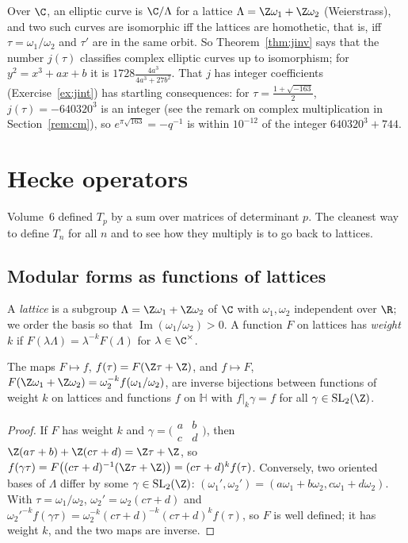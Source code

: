 Over $\C$, an elliptic curve is $\C/\Lambda$ for a lattice $\Lambda=\Z\omega_1+\Z\omega_2$ (Weierstrass), and two such curves are isomorphic iff the lattices are
homothetic, that is, iff $\tau=\omega_1/\omega_2$ and $\tau'$ are in the same orbit. So Theorem~\ref{thm:jinv} says that the number $j(\tau)$ classifies complex
elliptic curves up to isomorphism; for $y^2=x^3+ax+b$ it is $1728\frac{4a^3}{4a^3+27b^2}$. That $j$ has integer coefficients (Exercise~\ref{ex:jint}) has
startling consequences: for $\tau=\frac{1+\sqrt{-163}}2$, $j(\tau)=-640320^3$ is an integer (see the remark on complex multiplication in Section~\ref{rem:cm}), so $e^{\pi\sqrt{163}}=-q^{-1}$ is within $10^{-12}$ of the
integer $640320^3+744$.

\section{Hecke operators}

Volume~6 defined $T_p$ by a sum over matrices of determinant $p$. The cleanest way to define $T_n$ for all $n$ and to see how they multiply is to go back to lattices.

\subsection*{Modular forms as functions of lattices}

A \emph{lattice} is a subgroup $\Lambda=\Z\omega_1+\Z\omega_2$ of $\C$ with $\omega_1,\omega_2$ independent over $\R$; we order the basis so that
$\operatorname{Im}(\omega_1/\omega_2)>0$. A function $F$ on lattices has \emph{weight $k$} if $F(\lambda\Lambda)=\lambda^{-k}F(\Lambda)$ for $\lambda\in\C^\times$.

\begin{lemma}\label{lem:latticefn}
The maps $F\mapsto f$, $f(\tau)=F(\Z\tau+\Z)$, and $f\mapsto F$, $F(\Z\omega_1+\Z\omega_2)=\omega_2^{-k}f(\omega_1/\omega_2)$, are inverse bijections between
functions of weight $k$ on lattices and functions $f$ on $\mathbb H$ with $f|_k\gamma=f$ for all $\gamma\in\mathrm{SL}_2(\Z)$.
\end{lemma}
\begin{proof}
If $F$ has weight $k$ and $\gamma=\bigl(\begin{smallmatrix}a&b\\c&d\end{smallmatrix}\bigr)$, then $\Z(a\tau+b)+\Z(c\tau+d)=\Z\tau+\Z$, so
$f(\gamma\tau)=F\bigl((c\tau+d)^{-1}(\Z\tau+\Z)\bigr)=(c\tau+d)^kf(\tau)$. Conversely, two oriented bases of $\Lambda$ differ by some $\gamma\in\mathrm{SL}_2(\Z)$:
$(\omega_1',\omega_2')=(a\omega_1+b\omega_2,c\omega_1+d\omega_2)$. With $\tau=\omega_1/\omega_2$, $\omega_2'=\omega_2(c\tau+d)$ and
$\omega_2'^{-k}f(\gamma\tau)=\omega_2^{-k}(c\tau+d)^{-k}(c\tau+d)^kf(\tau)$, so $F$ is well defined; it has weight $k$, and the two maps are inverse.
\end{proof}

